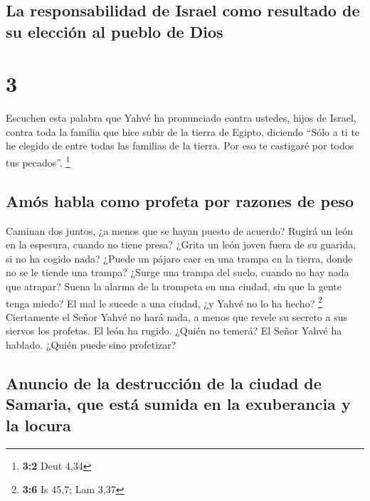 \hypertarget{la-responsabilidad-de-israel-como-resultado-de-su-elecciuxf3n-al-pueblo-de-dios}{%
\subsection{La responsabilidad de Israel como resultado de su elección
al pueblo de
Dios}\label{la-responsabilidad-de-israel-como-resultado-de-su-elecciuxf3n-al-pueblo-de-dios}}

\hypertarget{section-2}{%
\section{3}\label{section-2}}

 Escuchen esta palabra que Yahvé ha pronunciado contra
ustedes, hijos de Israel, contra toda la familia que hice subir de la
tierra de Egipto, diciendo  ``Sólo a ti te he elegido de
entre todas las familias de la tierra. Por eso te castigaré por todos
tus pecados''. \footnote{\textbf{3:2} Deut 4,34}

\hypertarget{amuxf3s-habla-como-profeta-por-razones-de-peso}{%
\subsection{Amós habla como profeta por razones de
peso}\label{amuxf3s-habla-como-profeta-por-razones-de-peso}}

 Caminan dos juntos, ¿a menos que se hayan puesto de
acuerdo?  Rugirá un león en la espesura, cuando no tiene
presa? ¿Grita un león joven fuera de su guarida, si no ha cogido nada?
 ¿Puede un pájaro caer en una trampa en la tierra, donde
no se le tiende una trampa? ¿Surge una trampa del suelo, cuando no hay
nada que atrapar?  Suena la alarma de la trompeta en una
ciudad, sin que la gente tenga miedo? El mal le sucede a una ciudad, ¿y
Yahvé no lo ha hecho? \footnote{\textbf{3:6} Is 45,7; Lam 3,37}
 Ciertamente el Señor Yahvé no hará nada, a menos que
revele su secreto a sus siervos los profetas.  El león ha
rugido. ¿Quién no temerá? El Señor Yahvé ha hablado. ¿Quién puede sino
profetizar?

\hypertarget{anuncio-de-la-destrucciuxf3n-de-la-ciudad-de-samaria-que-estuxe1-sumida-en-la-exuberancia-y-la-locura}{%
\subsection{Anuncio de la destrucción de la ciudad de Samaria, que está
sumida en la exuberancia y la
locura}\label{anuncio-de-la-destrucciuxf3n-de-la-ciudad-de-samaria-que-estuxe1-sumida-en-la-exuberancia-y-la-locura}}

